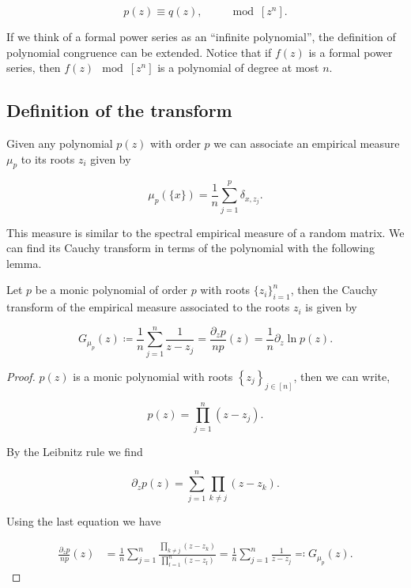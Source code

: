 \begin{equation*}
    p(z) \equiv q(z), \qquad \mod [z^n].
\end{equation*}

If we think of a formal power series as an ``infinite polynomial'', the definition of polynomial congruence can be extended. Notice that if $f(z)$ is a formal power series, then $f(z) \mod [z^n]$ is a polynomial of degree at most $n$.

\subsection{Definition of the transform}

Given any polynomial $p(z)$ with order $p$ we can associate an empirical measure $\mu_p$ to its roots $z_i$ given by

\begin{equation*}
    \mu_p(\{x\}) = \frac1n\sum_{j=1}^p \delta_{x,z_j}.
\end{equation*}

This measure is similar to the spectral empirical measure of a random matrix. We can find its Cauchy transform in terms of the polynomial with the following lemma.

\begin{lemma} \label{lemma:cauchy_empirical_polynomial}
    Let $p$ be a monic polynomial of order $p$ with roots $\{z_i\}_{i=1}^n$, then the Cauchy transform of the empirical measure associated to the roots $z_i$ is given by 

    \begin{equation*}
        G_{\mu_p}(z) \coloneqq \frac1n \sum_{j=1}^n \frac1{z - z_j} = \frac{\partial_z p }{n p}(z) = \frac1n \partial_z \ln p(z).
    \end{equation*}

\end{lemma}

\begin{proof}
    $p(z)$ is a monic polynomial with roots $\left\{ z_j \right\}_{j \in [n]}$, then we can write,

    \begin{equation*}
        p(z) = \prod_{j=1}^n (z-z_j).
    \end{equation*}

    By the Leibnitz rule we find

    \begin{equation*}
        \partial_z p(z) = \sum_{j=1}^n \prod_{k\neq j} (z-z_k).
    \end{equation*}

    Using the last equation we have

    \begin{align*}
        \frac{\partial_z p}{n p}(z) &= \frac1n\sum_{j=1}^n \frac{\prod_{k\neq j} (z-z_k) }{ \prod_{l=1}^n (z-z_l) } = \frac1n\sum_{j=1}^n \frac{1}{z - z_j} \eqqcolon G_{\mu_p}(z).
    \end{align*}
\end{proof}

